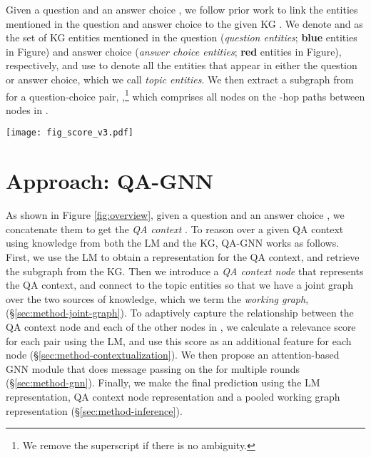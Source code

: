 \documentclass[11pt]{article}
\newcommand{\methodname}{QA-GNN\xspace}
\begin{document}
Given a question  and an answer choice , 
we follow prior work \cite{lin2019kagnet} to 
link the entities mentioned in the question and answer choice to the given KG . 
We denote  and  as the set of KG entities mentioned in the question (\textit{question entities}; \textcolor{bluenode}{\textbf{blue}} entities in Figure) and answer choice (\textit{answer choice entities}; \textcolor{rednode}{\textbf{red}} entities in Figure), respectively, and use  to denote all the entities that appear in either the question or answer choice, which we call \textit{topic entities}. We then extract a subgraph from  for a question-choice pair, ,\footnote{We remove the superscript  if there is no ambiguity.\vspace{-0mm}} which comprises all nodes on the -hop paths between nodes in .
 \begin{figure*}[!th]
    \vspace{-2mm}
\centering \texttt{[image: fig\_score\_v3.pdf]}
\vspace{-2mm}
    \caption{Relevance scoring of the retrieved KG: we use a pre-trained LM to calculate the relevance of each KG entity node conditioned on the QA context (\S \ref{sec:method-contextualization}).
    }
\label{fig:contextualization}
\end{figure*}


\section{Approach: \methodname}\label{sec:method}

As shown in Figure \ref{fig:overview}, 
given a question and an answer choice , we concatenate them to get the \textit{QA context} .
To reason over a given QA context using knowledge from both the LM and the KG, \methodname works as follows.
First, we use the LM to obtain a representation for the QA context, and retrieve the subgraph  from the KG. 
Then we introduce a \textit{QA context node}  that represents the QA context, and connect  to the topic entities  so that we have a joint graph over the two sources of knowledge, which we term the \textit{working graph},  (\S \ref{sec:method-joint-graph}). 
To adaptively capture the relationship between the QA context node and each of the other nodes in , we calculate a relevance score for each pair using the LM, and use this score as an additional feature for each node (\S \ref{sec:method-contextualization}). 
We then propose an attention-based GNN module
that does message passing on the  for multiple rounds (\S \ref{sec:method-gnn}). Finally, we make the final prediction using the LM representation, QA context node representation and a pooled working graph representation (\S \ref{sec:method-inference}).
\end{document}

